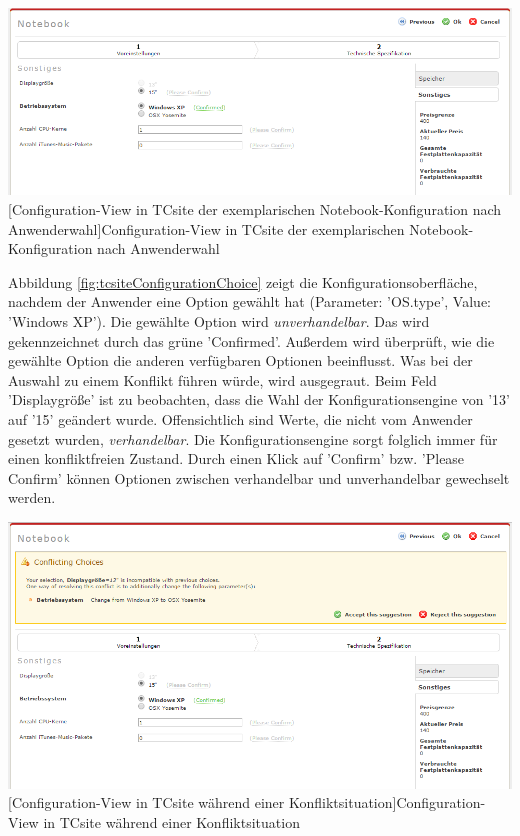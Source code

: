 \documentclass[11pt, a4paper, titlepage, listof=totoc, bibliography=totoc, index=totoc, twoside, openright, headings=normal]{scrreprt}
\begin{document}
\vspace{1em}
\begin{minipage}{\linewidth}
	\centering
	\includegraphics[width=1\linewidth]{Abbildungen/tcsiteConfigurationChoice.PNG}
	[Configuration-View in TCsite der exemplarischen Notebook-Konfiguration nach Anwenderwahl]{Configuration-View in TCsite der exemplarischen Notebook-Konfiguration nach Anwenderwahl}
	\label{fig:tcsiteConfigurationChoice}
\end{minipage}
\vspace{0.3em}

Abbildung \ref{fig:tcsiteConfigurationChoice} zeigt die Konfigurationsoberfläche, nachdem der Anwender eine Option gewählt hat (Parameter: 'OS.type', Value: 'Windows XP'). Die gewählte Option wird \emph{unverhandelbar}. Das wird gekennzeichnet durch das grüne 'Confirmed'. Außerdem wird überprüft, wie die gewählte Option die anderen verfügbaren Optionen beeinflusst. Was bei der Auswahl zu einem Konflikt führen würde, wird ausgegraut. Beim Feld 'Displaygröße' ist zu beobachten, dass die Wahl der Konfigurationsengine von '13' auf '15' geändert wurde. Offensichtlich sind Werte, die nicht vom Anwender gesetzt wurden, \emph{verhandelbar}. Die Konfigurationsengine sorgt folglich immer für einen konfliktfreien Zustand. Durch einen Klick auf 'Confirm' bzw. 'Please Confirm' können Optionen zwischen verhandelbar und unverhandelbar gewechselt werden.

\vspace{1em}
\begin{minipage}{\linewidth}
	\centering
	\includegraphics[width=1\linewidth]{Abbildungen/tcsiteConfigurationConflict.PNG}
	[Configuration-View in TCsite während einer Konfliktsituation]{Configuration-View in TCsite während einer Konfliktsituation}
	\label{fig:tcsiteConfigurationConflict}
\end{minipage}
\vspace{0.3em}
\end{document}
